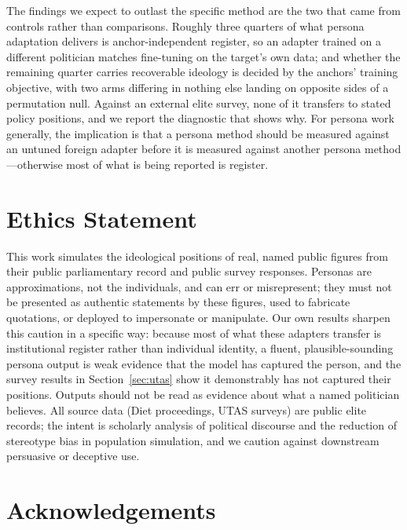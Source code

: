 \documentclass[11pt,letterpaper]{article}
\begin{document}
The findings we expect to outlast the specific method are the two that came from controls rather than comparisons. Roughly three quarters of what persona adaptation delivers is anchor-independent register, so an adapter trained on a different politician matches fine-tuning on the target's own data; and whether the remaining quarter carries recoverable ideology is decided by the anchors' training objective, with two arms differing in nothing else landing on opposite sides of a permutation null. Against an external elite survey, none of it transfers to stated policy positions, and we report the diagnostic that shows why. For persona work generally, the implication is that a persona method should be measured against an untuned foreign adapter before it is measured against another persona method---otherwise most of what is being reported is register.

\section*{Ethics Statement}
This work simulates the ideological positions of real, named public figures from their public parliamentary record and public survey responses. Personas are approximations, not the individuals, and can err or misrepresent; they must not be presented as authentic statements by these figures, used to fabricate quotations, or deployed to impersonate or manipulate. Our own results sharpen this caution in a specific way: because most of what these adapters transfer is institutional register rather than individual identity, a fluent, plausible-sounding persona output is weak evidence that the model has captured the person, and the survey results in Section~\ref{sec:utas} show it demonstrably has not captured their positions. Outputs should not be read as evidence about what a named politician believes. All source data (Diet proceedings, UTAS surveys) are public elite records; the intent is scholarly analysis of political discourse and the reduction of stereotype bias in population simulation, and we caution against downstream persuasive or deceptive use.

\section*{Acknowledgements}





\end{document}
